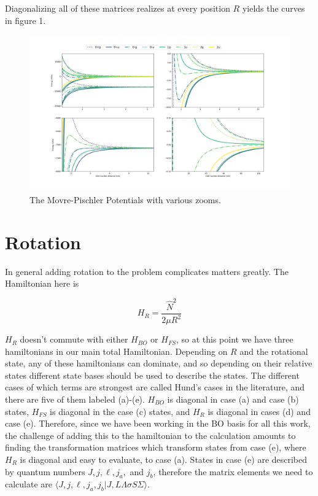\documentclass[prl, longbibliography]{revtex4-2}
\begin{document}
Diagonalizing all of these matrices realizes at every position $R$ yields the curves in figure 1.   
\begin{figure}
  \centering
    \includegraphics[width=\textwidth]{Movre-Pischler}
    \caption{The Movre-Pischler Potentials with various zooms.}
\end{figure}

\section{Rotation}

In general adding rotation to the problem complicates matters greatly. The Hamiltonian here is

\begin{equation}
H_R = \frac{\hat{N}^2}{2\mu R^2}
\end{equation}

$H_R$ doesn't commute with either $H_{BO}$ or $H_{FS}$, so at this point we have three hamiltonians in our main total Hamiltonian. Depending on $R$ and the rotational state, any of these hamiltonians can dominate, and so depending on their relative states different state bases should be used to describe the states. The different cases of which terms are strongest are called Hund's cases in the literature, and there are five of them labeled (a)-(e). $H_{BO}$ is diagonal in case (a) and case (b) states, $H_{FS}$ is diagonal in the case (c) states, and $H_R$ is diagonal in cases (d) and case (e). Therefore, since we have been working in the BO basis for all this work, the challenge of adding this to the hamiltonian to the calculation amounts to finding the transformation matrices which transform states from case (e), where $H_R$ is diagonal and easy to evaluate, to case (a). States in case (e) are described by quantum numbers $J, j, \ell, j_a, $ and $j_b$, therefore the matrix elements we need to calculate are $\langle J, j, \ell, j_a, j_b|J, L\Lambda\sigma S \Sigma\rangle$.
\end{document}
